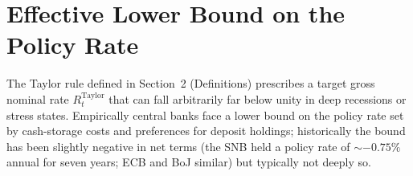 %
%
%
%

\section{Effective Lower Bound on the Policy Rate}
\label{sec:elb}

The Taylor rule defined in Section~2 (Definitions) prescribes a target
gross nominal rate $R^{\text{Taylor}}_t$ that can fall arbitrarily far
below unity in deep recessions or stress states. Empirically central
banks face a lower bound on the policy rate set by cash-storage costs
and preferences for deposit holdings; historically the bound has been
slightly negative in net terms (the SNB held a policy rate of
${\sim}-0.75\%$ annual for seven years; ECB and BoJ similar) but
typically not deeply so.

